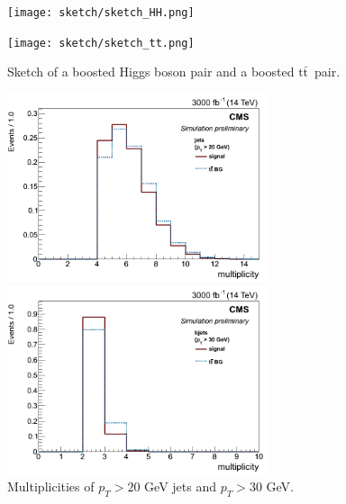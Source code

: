 \documentclass[10pt,a4paper]{article}
\newcommand{\ww}{7.7cm} %
\newcommand{\dd}{-2mm} %
\renewcommand{\tt}{\ensuremath{\text{t}\bar{\text{t}}}}
\begin{document}
\begin{figure}[h]
    \begin{minipage}[h!]{\ww}
      \centering
      \texttt{[image: sketch/sketch\_HH.png]}
    \end{minipage}
    \begin{minipage}[h!]{\ww}
      \centering
      \texttt{[image: sketch/sketch\_tt.png]}
    \end{minipage}
  \caption{Sketch of a boosted Higgs boson pair and a boosted \tt\ pair.} \label{sketch}
\end{figure}


\begin{figure}[h]
    \begin{minipage}[h!]{\ww}
      \centering
      \includegraphics[width=\ww]{figs/Njets20.png}
    \end{minipage}
    \begin{minipage}[h!]{\ww}
      \centering
      \includegraphics[width=\ww]{figs/Nbjets30.png}
    \end{minipage}
  \vspace{\dd}
  \caption{Multiplicities of $p_T>20$ GeV jets and $p_T>30$ GeV.} \label{multi}
\end{figure}
\end{document}

